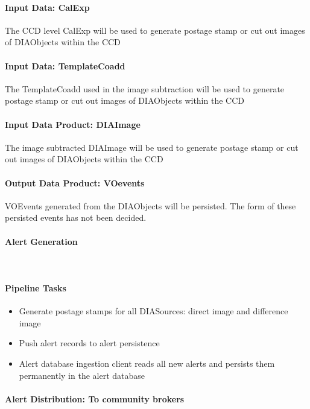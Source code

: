 \paragraph{Input Data: CalExp}

The CCD level CalExp will be used to generate postage stamp or cut out images of DIAObjects  within the CCD

\paragraph{Input Data: TemplateCoadd}

The TemplateCoadd used in the image subtraction will be used to  generate postage stamp or cut out images of DIAObjects   within the CCD


\paragraph{Input Data Product: DIAImage}

The image subtracted DIAImage will be used to  generate postage stamp or cut out images of DIAObjects within the CCD

\paragraph{Output Data Product: VOevents}

VOEvents generated from the DIAObjects will be persisted. The form of these persisted events has  not been decided.

\paragraph{Alert Generation}~

\paragraph{Pipeline Tasks}
 \begin{itemize}
\item Generate postage stamps for all DIASources: direct image and difference image
\item Push alert records to alert persistence
\item Alert database ingestion client reads all new alerts and persists them permanently in the alert database
\end{itemize}

\paragraph{Alert Distribution: To community brokers}

